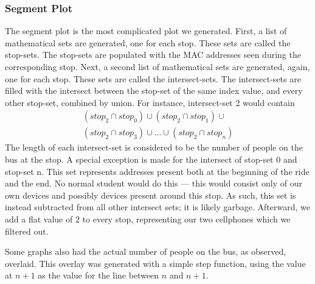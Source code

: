 \subsubsection*{Segment Plot}
The segment plot is the most complicated plot we generated.
First, a list of mathematical sets are generated, one for each stop.
These sets are called the stop-sets.
The stop-sets are populated with the MAC addresses seen during the corresponding stop.
Next, a second list of mathematical sets are generated, again, one for each stop.
These sets are called the intersect-sets.
The intersect-sets are filled with the intersect between the stop-set of the same index value, and every other stop-set, combined by union.
For instance, intersect-set 2 would contain
\begin{multline*}
  \left(stop_2 \cap stop_0\right) \cup \left(stop_2 \cap stop_1\right) \cup \\
  \left(stop_2 \cap stop_3\right) \cup \dots \cup \left(stop_2 \cap stop_n\right)
\end{multline*}
The length of each intersect-set is considered to be the number of people on the bus at the stop.
A special exception is made for the intersect of stop-set 0 and stop-set n.
This set represents addresses present both at the beginning of the ride and the end.
No normal student would do this --- this would consist only of our own devices and possibly devices present around this stop.
As such, this set is instead subtracted from all other intersect sets; it is likely garbage.
Afterward, we add a flat value of $2$ to every stop, representing our two cellphones which we filtered out.

Some graphs also had the actual number of people on the bus, as observed, overlaid.
This overlay was generated with a simple step function, using the value at $n+1$ as the value for the line between $n$ and $n+1$.
